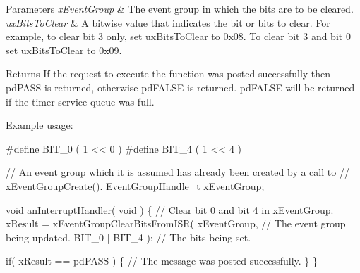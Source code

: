 \begin{DoxyParams}{Parameters}
{\em x\+Event\+Group} & The event group in which the bits are to be cleared.\\
\hline
{\em ux\+Bits\+To\+Clear} & A bitwise value that indicates the bit or bits to clear. For example, to clear bit 3 only, set ux\+Bits\+To\+Clear to 0x08. To clear bit 3 and bit 0 set ux\+Bits\+To\+Clear to 0x09.\\
\hline
\end{DoxyParams}
\begin{DoxyReturn}{Returns}
If the request to execute the function was posted successfully then pd\+P\+A\+SS is returned, otherwise pd\+F\+A\+L\+SE is returned. pd\+F\+A\+L\+SE will be returned if the timer service queue was full.
\end{DoxyReturn}
Example usage\+: 
\begin{DoxyPre}
  #define BIT\_0 ( 1 << 0 )
  #define BIT\_4 ( 1 << 4 )\end{DoxyPre}



\begin{DoxyPre}  // An event group which it is assumed has already been created by a call to
  // xEventGroupCreate().
  EventGroupHandle\_t xEventGroup;\end{DoxyPre}



\begin{DoxyPre}  void anInterruptHandler( void )
  \{
    // Clear bit 0 and bit 4 in xEventGroup.
    xResult = xEventGroupClearBitsFromISR(
                        xEventGroup,     // The event group being updated.
                        BIT\_0 | BIT\_4 ); // The bits being set.\end{DoxyPre}



\begin{DoxyPre}    if( xResult == pdPASS )
    \{
        // The message was posted successfully.
    \}
 \}
  \end{DoxyPre}
 